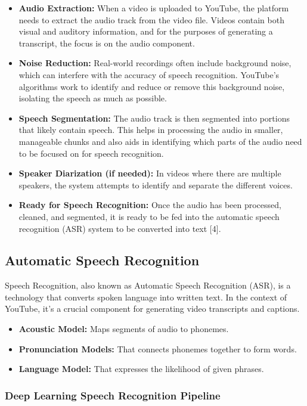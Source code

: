 \begin{itemize}
    \item \textbf{Audio Extraction:} When a video is uploaded to YouTube, the platform needs to extract the audio track from the video file. Videos contain both visual and auditory information, and for the purposes of generating a transcript, the focus is on the audio component.
    \item \textbf{Noise Reduction:} Real-world recordings often include background noise, which can interfere with the accuracy of speech recognition. YouTube’s algorithms work to identify and reduce or remove this background noise, isolating the speech as much as possible.
    \item \textbf{Speech Segmentation:} The audio track is then segmented into portions that likely contain speech. This helps in processing the audio in smaller, manageable chunks and also aids in identifying which parts of the audio need to be focused on for speech recognition.
    \item \textbf{Speaker Diarization (if needed):} In videos where there are multiple speakers, the system attempts to identify and separate the different voices.
    \item \textbf{Ready for Speech Recognition:} Once the audio has been processed, cleaned, and segmented, it is ready to be fed into the automatic speech recognition (ASR) system to be converted into text [4].
\end{itemize}

\subsection*{Automatic Speech Recognition}

Speech Recognition, also known as Automatic Speech Recognition (ASR), is a technology that converts spoken language into written text. In the context of YouTube, it’s a crucial component for generating video transcripts and captions.

\begin{itemize}
    \item \textbf{Acoustic Model:} Maps segments of audio to phonemes.
    \item \textbf{Pronunciation Models:} That connects phonemes together to form words.
    \item \textbf{Language Model:} That expresses the likelihood of given phrases.
\end{itemize}

\subsubsection*{Deep Learning Speech Recognition Pipeline}

